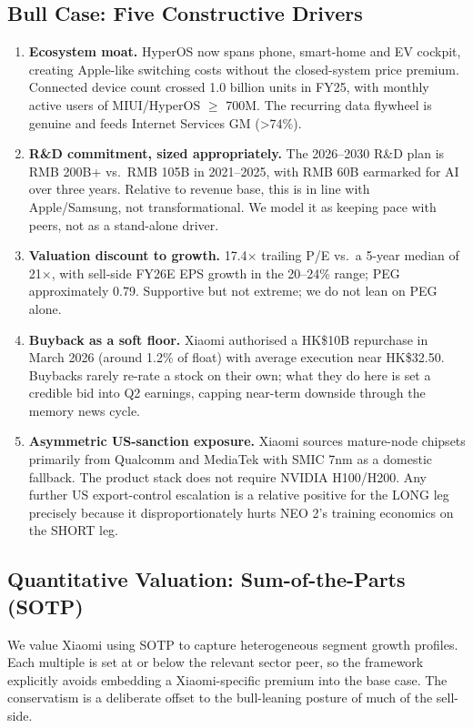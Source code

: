 \documentclass[11pt,a4paper]{article}
\begin{document}
\subsection{Bull Case: Five Constructive Drivers}

\begin{enumerate}
\item \textbf{Ecosystem moat.} HyperOS now spans phone, smart-home and EV cockpit, creating Apple-like switching costs without the closed-system price premium. Connected device count crossed 1.0 billion units in FY25, with monthly active users of MIUI/HyperOS $\geq$ 700M. The recurring data flywheel is genuine and feeds Internet Services GM (>74\%).
\item \textbf{R\&D commitment, sized appropriately.} The 2026--2030 R\&D plan is RMB 200B+ vs.\ RMB 105B in 2021--2025, with RMB 60B earmarked for AI over three years. Relative to revenue base, this is in line with Apple/Samsung, not transformational. We model it as keeping pace with peers, not as a stand-alone driver.
\item \textbf{Valuation discount to growth.} 17.4$\times$ trailing P/E vs.\ a 5-year median of 21$\times$, with sell-side FY26E EPS growth in the 20--24\% range; PEG approximately 0.79. Supportive but not extreme; we do not lean on PEG alone.
\item \textbf{Buyback as a soft floor.} Xiaomi authorised a HK\$10B repurchase in March 2026 (around 1.2\% of float) with average execution near HK\$32.50. Buybacks rarely re-rate a stock on their own; what they do here is set a credible bid into Q2 earnings, capping near-term downside through the memory news cycle.
\item \textbf{Asymmetric US-sanction exposure.} Xiaomi sources mature-node chipsets primarily from Qualcomm and MediaTek with SMIC 7nm as a domestic fallback. The product stack does not require NVIDIA H100/H200. Any further US export-control escalation is a relative positive for the LONG leg precisely because it disproportionately hurts NEO 2's training economics on the SHORT leg.
\end{enumerate}

\subsection{Quantitative Valuation: Sum-of-the-Parts (SOTP)}

We value Xiaomi using SOTP to capture heterogeneous segment growth profiles. Each multiple is set at or below the relevant sector peer, so the framework explicitly avoids embedding a Xiaomi-specific premium into the base case. The conservatism is a deliberate offset to the bull-leaning posture of much of the sell-side.
\end{document}
